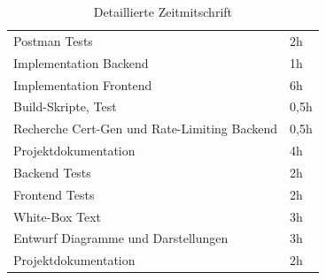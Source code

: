\begin{table}[htbp]
\begin{tabular}{ l l }
	Postman Tests & 2h \\
	Implementation Backend & 1h \\
	Implementation Frontend & 6h \\
	Build-Skripte, Test & 0,5h \\
	Recherche Cert-Gen und Rate-Limiting Backend & 0,5h \\
	Projektdokumentation & 4h \\
	Backend Tests & 2h \\
	Frontend Tests & 2h \\
	White-Box Text & 3h \\
	Entwurf Diagramme und Darstellungen & 3h \\
	Projektdokumentation & 2h \\
	\end{tabular}
	\caption{Detaillierte Zeitmitschrift}
	\label{tab:zeitaufwand}
	\end{table}
\clearpage

